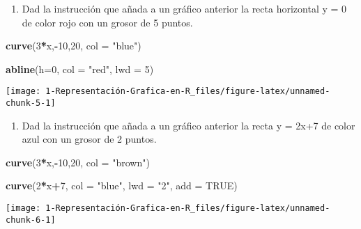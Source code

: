 \documentclass[
]{article}
\newenvironment{Shaded}{\begin{snugshade}}{\end{snugshade}}
\newcommand{\DataTypeTok}[1]{\textcolor[rgb]{0.13,0.29,0.53}{#1}}
\newcommand{\DecValTok}[1]{\textcolor[rgb]{0.00,0.00,0.81}{#1}}
\newcommand{\KeywordTok}[1]{\textcolor[rgb]{0.13,0.29,0.53}{\textbf{#1}}}
\newcommand{\NormalTok}[1]{#1}
\newcommand{\OperatorTok}[1]{\textcolor[rgb]{0.81,0.36,0.00}{\textbf{#1}}}
\newcommand{\OtherTok}[1]{\textcolor[rgb]{0.56,0.35,0.01}{#1}}
\newcommand{\StringTok}[1]{\textcolor[rgb]{0.31,0.60,0.02}{#1}}
\providecommand{\tightlist}{%
  \setlength{\itemsep}{0pt}\setlength{\parskip}{0pt}}
\begin{document}
\begin{enumerate}
\def\labelenumi{\arabic{enumi}.}
\setcounter{enumi}{4}
\tightlist
\item
  Dad la instrucción que añada a un gráfico anterior la recta horizontal
  y = 0 de color rojo con un grosor de 5 puntos.
\end{enumerate}

\begin{Shaded}
\begin{Highlighting}[]
\KeywordTok{curve}\NormalTok{(}\DecValTok{3}\OperatorTok{*}\NormalTok{x,}\OperatorTok{-}\DecValTok{10}\NormalTok{,}\DecValTok{20}\NormalTok{, }\DataTypeTok{col =} \StringTok{"blue"}\NormalTok{)}

\KeywordTok{abline}\NormalTok{(}\DataTypeTok{h=}\DecValTok{0}\NormalTok{, }\DataTypeTok{col =} \StringTok{"red"}\NormalTok{,}
       \DataTypeTok{lwd =} \DecValTok{5}\NormalTok{)}
\end{Highlighting}
\end{Shaded}

\begin{center}\texttt{[image: 1-Representación-Grafica-en-R\_files/figure-latex/unnamed-chunk-5-1]} \end{center}

\begin{enumerate}
\def\labelenumi{\arabic{enumi}.}
\setcounter{enumi}{5}
\tightlist
\item
  Dad la instrucción que añada a un gráfico anterior la recta y = 2x+7
  de color azul con un grosor de 2 puntos.
\end{enumerate}

\begin{Shaded}
\begin{Highlighting}[]
\KeywordTok{curve}\NormalTok{(}\DecValTok{3}\OperatorTok{*}\NormalTok{x,}\OperatorTok{-}\DecValTok{10}\NormalTok{,}\DecValTok{20}\NormalTok{, }\DataTypeTok{col =} \StringTok{"brown"}\NormalTok{)}

\KeywordTok{curve}\NormalTok{(}\DecValTok{2}\OperatorTok{*}\NormalTok{x}\OperatorTok{+}\DecValTok{7}\NormalTok{, }\DataTypeTok{col =} \StringTok{"blue"}\NormalTok{,}
      \DataTypeTok{lwd =} \StringTok{"2"}\NormalTok{, }\DataTypeTok{add =} \OtherTok{TRUE}\NormalTok{)}
\end{Highlighting}
\end{Shaded}

\begin{center}\texttt{[image: 1-Representación-Grafica-en-R\_files/figure-latex/unnamed-chunk-6-1]} \end{center}
\end{document}
